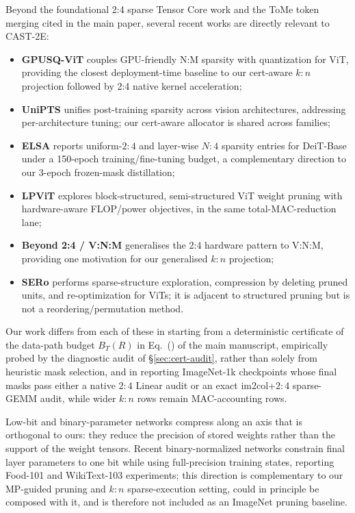 \documentclass[11pt]{article}
\makeatletter
\theoremstyle{plain}
\theoremstyle{definition}
\theoremstyle{remark}
\newcommand{\1}{\mathbf{1}}
\newcommand{\mainref}[1]{\@ifundefined{r@main-#1}{\@ifundefined{r@#1}{\ref*{orone-#1}}{\ref{#1}}}{\ref*{main-#1}}}
\makeatother
\begin{document}
Beyond the foundational 2:4 sparse Tensor Core work \citep{mishra2021accelerating} and the ToMe token merging \citep{bolya2023tome} cited in the main paper, several recent works are directly relevant to CAST-2E:
\begin{itemize}[leftmargin=2em]
\item \textbf{GPUSQ-ViT} \citep{gpusq_vit2023} couples GPU-friendly N:M sparsity with quantization for ViT, providing the closest deployment-time baseline to our cert-aware $k{:}n$ projection followed by 2:4 native kernel acceleration;
\item \textbf{UniPTS} \citep{xie2024unipts} unifies post-training sparsity across vision architectures, addressing per-architecture tuning; our cert-aware allocator is shared across families;
\item \textbf{ELSA} \citep{elsa2024} reports uniform-$2{:}4$ and layer-wise $N{:}4$ sparsity entries for DeiT-Base under a 150-epoch training/fine-tuning budget, a complementary direction to our 3-epoch frozen-mask distillation;
\item \textbf{LPViT} \citep{lpvit2024} explores block-structured, semi-structured ViT weight pruning with hardware-aware FLOP/power objectives, in the same total-MAC-reduction lane;
\item \textbf{Beyond 2:4 / V:N:M} \citep{beyond_24_2024} generalises the 2:4 hardware pattern to V:N:M, providing one motivation for our generalised $k{:}n$ projection;
\item \textbf{SERo} \citep{sero2025} performs sparse-structure exploration, compression by deleting pruned units, and re-optimization for ViTs; it is adjacent to structured pruning but is not a reordering/permutation method.
\end{itemize}
Our work differs from each of these in starting from a deterministic certificate of the data-path budget \(B_T(R)\) in Eq.~(\mainref{eq:data_path_budget}) of the main manuscript, empirically probed by the diagnostic audit of \S\ref{sec:cert-audit}, rather than solely from heuristic mask selection, and in reporting ImageNet-1k checkpoints whose final masks pass either a native \(2{:}4\) Linear audit or an exact im2col+\(2{:}4\) sparse-GEMM audit, while wider \(k{:}n\) rows remain MAC-accounting rows.

Low-bit and binary-parameter networks compress along an axis that is orthogonal to ours: they reduce the precision of stored weights rather than the support of the weight tensors. Recent binary-normalized networks \citep{cabral2025bit} constrain final layer parameters to one bit while using full-precision training states, reporting Food-101 and WikiText-103 experiments; this direction is complementary to our MP-guided pruning and \(k{:}n\) sparse-execution setting, could in principle be composed with it, and is therefore not included as an ImageNet pruning baseline.
\end{document}
